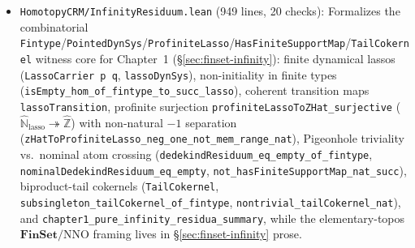 \documentclass[10pt,twoside,openright]{book}
\theoremstyle{crmplain}
\theoremstyle{crmdef}
\theoremstyle{crmremark}
\begin{document}
\begin{itemize}[leftmargin=1.5em]
  \item \texttt{HomotopyCRM/\allowbreak InfinityResiduum.lean} (949 lines, 20 checks): Formalizes the combinatorial \texttt{Fintype}/\allowbreak\texttt{PointedDynSys}/\allowbreak\texttt{ProfiniteLasso}/\allowbreak\texttt{HasFinite\allowbreak SupportMap}/\allowbreak\texttt{TailCokernel} witness core for Chapter~1 (\S\ref{sec:finset-infinity}): finite dynamical lassos (\texttt{LassoCarrier p q}, \texttt{lassoDynSys}), non-initiality in finite types (\texttt{isEmpty\_\allowbreak hom\_\allowbreak of\_\allowbreak fintype\_\allowbreak to\_\allowbreak succ\_\allowbreak lasso}), coherent transition maps \texttt{lassoTransition}, profinite surjection \texttt{profiniteLassoToZHat\_\allowbreak surjective} ($\widehat{\mathbb{N}}_{\mathrm{lasso}} \twoheadrightarrow \widehat{\mathbb{Z}}$) with non-natural $-1$ separation (\texttt{zHatToProfiniteLasso\_\allowbreak neg\_\allowbreak one\_\allowbreak not\_\allowbreak mem\_\allowbreak range\_\allowbreak nat}), Pigeonhole triviality vs.\ nominal atom crossing (\texttt{dedekindResiduum\_\allowbreak eq\_\allowbreak empty\_\allowbreak of\_\allowbreak fintype}, \texttt{nominalDedekindResiduum\_\allowbreak eq\_\allowbreak empty}, \texttt{not\_\allowbreak hasFiniteSupportMap\_\allowbreak nat\_\allowbreak succ}), biproduct-tail cokernels (\texttt{TailCokernel}, \texttt{subsingleton\_\allowbreak tailCokernel\_\allowbreak of\_\allowbreak fintype}, \texttt{nontrivial\_\allowbreak tailCokernel\_\allowbreak nat}), and \texttt{chapter1\_\allowbreak pure\_\allowbreak infinity\_\allowbreak residua\_\allowbreak summary}, while the elementary-topos $\mathbf{FinSet}/\mathrm{NNO}$ framing lives in \S\ref{sec:finset-infinity} prose.

\end{itemize}
\end{document}
